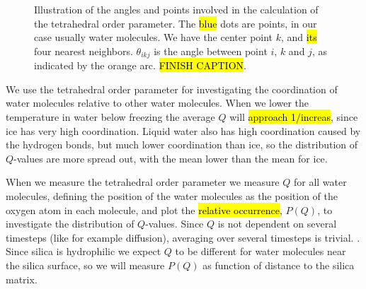 %
\begin{figure}[htpb]%
    \centering%
    \caption{%
        Illustration of the angles and points involved in the calculation of the tetrahedral order parameter. The \hl{blue} dots are points, in our case usually water molecules. We have the center point $k$, and \hl{its} four nearest neighbors. $\theta_{ikj}$ is the angle between point $i$, $k$ and $j$, as indicated by the orange arc. \hl{FINISH CAPTION}. %
        \label{fig:top_tetrahedra}%
    }%
\end{figure}%

We use the tetrahedral order parameter for investigating the coordination of water molecules relative to other water molecules. When we lower the temperature in water below freezing the average $Q$ will \hl{approach 1/increas}, since ice has very high coordination. Liquid water also has high coordination caused by the hydrogen bonds, but much lower coordination than ice, so the distribution of $Q$-values are more spread out, with the mean lower than the mean for ice.

When we measure the tetrahedral order parameter we measure $Q$ for all water molecules, defining the position of the water molecules as the position of the oxygen atom in each molecule, and plot the \hl{relative occurrence}, $P(Q)$, to investigate the distribution of $Q$-values. Since $Q$ is not dependent on several timesteps (like for example diffusion), averaging over several timesteps is trivial. . Since silica is hydrophilic we expect $Q$ to be different for water molecules near the silica surface, so we will measure $P(Q)$ as function of distance to the silica matrix.

